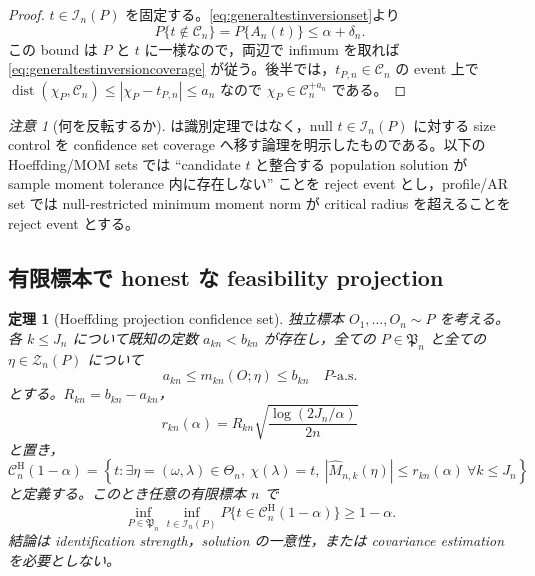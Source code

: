 \documentclass[11pt,a4paper]{ltjsarticle}
\newtheorem{theorem}{定理}[section]
\theoremstyle{remark}
\newtheorem{remark}{注意}[section]
\newcommand{\wh}{\widehat}
\newcommand{\abs}[1]{\left|#1\right|}
\newcommand{\cC}{\mathcal C}
\newcommand{\cI}{\mathcal I}
\newcommand{\cZ}{\mathcal Z}
\begin{document}
\begin{proof}
$t\in\cI_n(P)$ を固定する。\eqref{eq:generaltestinversionset}より
\[
P\{t\notin\cC_n\}=P\{A_n(t)\}\le\alpha+\delta_n.
\]
この bound は $P$ と $t$ に一様なので，両辺で infimum を取れば
\eqref{eq:generaltestinversioncoverage} が従う。後半では，$t_{P,n}\in\cC_n$ の event 上で
$\operatorname{dist}(\chi_P,\cC_n)\le|\chi_P-t_{P,n}|\le a_n$ なので
$\chi_P\in\cC_n^{+a_n}$ である。
\end{proof}

\begin{remark}[何を反転するか]\label{rem:testinversionmeaning}
は識別定理ではなく，null $t\in\cI_n(P)$ に対する size control を confidence set coverage へ移す論理を明示したものである。以下の Hoeffding/MOM sets では ``candidate $t$ と整合する population solution が sample moment tolerance 内に存在しない'' ことを reject event とし，profile/AR set では null-restricted minimum moment norm が critical radius を超えることを reject event とする。
\end{remark}

\subsection{有限標本で honest な feasibility projection}

\begin{theorem}[Hoeffding projection confidence set]\label{thm:hoeffdingprojection}
独立標本 $O_1,\ldots,O_n\sim P$ を考える。各 $k\le J_n$ について既知の定数 $a_{kn}<b_{kn}$ が存在し，全ての $P\in\mathfrak P_n$ と全ての $\eta\in\cZ_n(P)$ について
\begin{equation}
a_{kn}\le m_{kn}(O;\eta)\le b_{kn}
\quad P\text{-a.s.}
\label{eq:boundedtruemoment}
\end{equation}
とする。$R_{kn}=b_{kn}-a_{kn}$，
\[
r_{kn}(\alpha)
=R_{kn}\sqrt{\frac{\log(2J_n/\alpha)}{2n}}
\]
と置き，
\begin{equation}
\cC^{\mathrm H}_{n}(1-\alpha)
=\left\{t:\exists\eta=(\omega,\lambda)\in\Theta_n,
\ \chi(\lambda)=t,
\ \abs{\wh M_{n,k}(\eta)}\le r_{kn}(\alpha)
\ \forall k\le J_n
\right\}
\label{eq:hoeffdingprojectionset}
\end{equation}
と定義する。このとき任意の有限標本 $n$ で
\begin{equation}
\inf_{P\in\mathfrak P_n}
\inf_{t\in\cI_n(P)}
P\{t\in\cC^{\mathrm H}_{n}(1-\alpha)\}
\ge1-\alpha.
\label{eq:finitehonestHoeffding}
\end{equation}
結論は identification strength，solution の一意性，または covariance estimation を必要としない。
\end{theorem}
\end{document}
